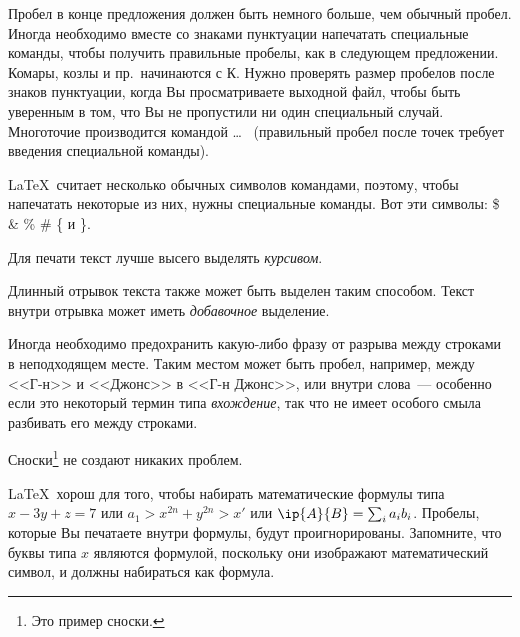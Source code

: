 \documentclass{article}      %
\begin{document}
Пробел в конце предложения должен быть немного больше, чем
обычный пробел.  Иногда необходимо вместе со знаками пунктуации
напечатать специальные команды, чтобы получить правильные
пробелы, как в следующем предложении.
        Комары, козлы и        %
        пр.\ начинаются
        с К\@.                 %
Нужно проверять размер пробелов после знаков пунктуации, когда
Вы просматриваете выходной файл, чтобы быть уверенным в том, что Вы
не пропустили ни один специальный случай.
Многоточие производится командой
       \ldots\               %
(правильный пробел после точек требует введения специальной
команды).

\LaTeX\ считает несколько обычных символов командами,
поэтому, чтобы напечатать некоторые из них,     нужны
специальные команды. Вот эти символы:
       \$ \& \% \# \{ и \}.

Для печати текст лучше высего выделять \emph{курсивом}.

\begin{em}
   Длинный отрывок текста также может быть выделен
   таким способом. Текст внутри отрывка может
   иметь \emph{добавочное} выделение.
\end{em}

Иногда необходимо предохранить какую-либо фразу от разрыва
между строками в неподходящем месте. Таким местом может
быть пробел, например, между <<Г-н>> и <<Джонс>> в
        <<Г-н Джонс>>,    %
или внутри слова~--- особенно если это некоторый термин типа
        \mbox{\emph{вхождение}},
так что не имеет особого смыла разбивать его между строками.

Сноски\footnote{Это пример сноски.} не создают никаких проблем.

\LaTeX\ хорош для того, чтобы набирать математические формулы
типа
       \( x-3y + z = 7 \)
или
       \( a_{1} > x^{2n} + y^{2n} > x' \)
или
       \( \ip{A}{B} = \sum_{i} a_{i} b_{i} \).
Пробелы, которые Вы печатаете внутри формулы, будут
проигнорированы. Запомните, что буквы типа
       $x$                   %
являются формулой, поскольку они изображают математический символ,
и должны набираться как формула.
\end{document}

